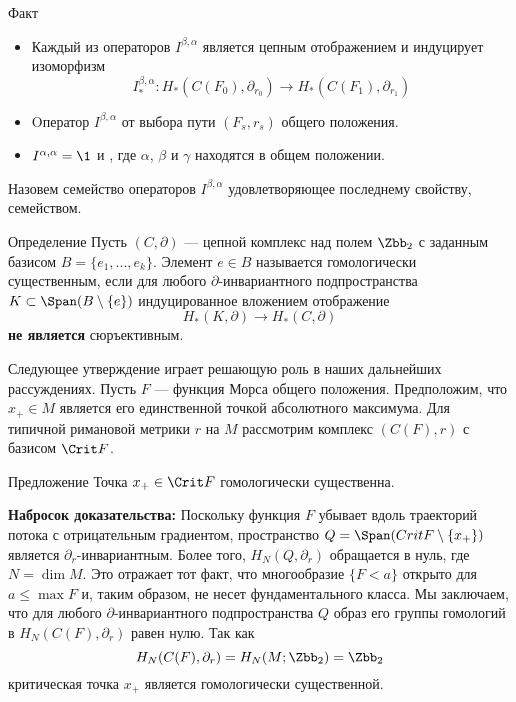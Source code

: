 \begin{thm}{Факт}\label{13.2.E}
  \begin{itemize}
  \item
    Каждый из операторов $I^{\beta,\alpha}$ является цепным
    отображением и индуцирует изоморфизм
    \[
    I^{\beta,\alpha}_{*} :
    H_{*}(C(F_{0}),\partial_{r_{0}}) \to
    H_{*}(C(F_{1}),\partial_{r_{1}})
    \]
  \item
    Oператор $I^{\beta,\alpha}$ 
    от выбора пути $(F_{s},r_{s})$ общего положения.
  \item
    $I^{\alpha,\alpha}=\1$ и , где $\alpha$, $\beta$ и
    $\gamma$ находятся в общем положении.
  \end{itemize}
\end{thm}

Назовем семейство операторов $I^{\beta,\alpha}$ удовлетворяющее
последнему свойству,  семейством. 

\begin{ex}{Определение}\label{13.2.F}
  Пусть $(C, \partial)$ --- цепной комплекс над полем $\Zbb_{2}$
  с заданным базисом $B = \{e_{1},...,e_{k}\}$.
  Элемент $e\in B$ называется гомологически существенным, если для
  любого $\partial$-инвариантного подпространства
  $K\subset \Span(B\setminus \{e\})$ индуцированное вложением отображение
  \[
  H_{*}(K,\partial)\to H_{*}(C,\partial)
  \]
  \textbf{не является} сюръективным.
\end{ex}

Следующее утверждение играет решающую роль в наших дальнейших рассуждениях.
Пусть $F$ — функция Морса общего положения.
Предположим, что $x_{+}\in M$ является его единственной точкой
абсолютного максимума. 
Для типичной римановой метрики $r$ на $M$ рассмотрим комплекс
$(C(F),r)$ с базисом $\Crit F$. 

\begin{thm}{Предложение}\label{13.2.G}
  Точка $x_{+}\in\Crit F$ гомологически существенна.  
\end{thm}

\noindent\textbf{Набросок доказательства:} Поскольку функция $F$
убывает вдоль траекторий потока с отрицательным градиентом,
пространство
$Q = \Span( Crit F \setminus \{x_{+}\})$ является $\partial_{r}$-инвариантным.
Более того, $H_{N}(Q,\partial_{r})$ обращается в нуль, где $N = \dim M$.
Это отражает тот факт, что многообразие $\{F<a\}$ открыто для $a\leq
\max F$ и, таким образом, не несет фундаментального класса. 
Мы заключаем, что для любого $\partial$-инвариантного подпространства
$Q$ образ его группы гомологий в $H_{N}(C(F),\partial_{r})$ равен
нулю. Так как
\[
H_{N}(C(F),\partial_{r})=H_{N}(M;\Zbb_{2})=\Zbb_{2}
\]
критическая точка $x_{+}$ является гомологически существенной.
\qeds

